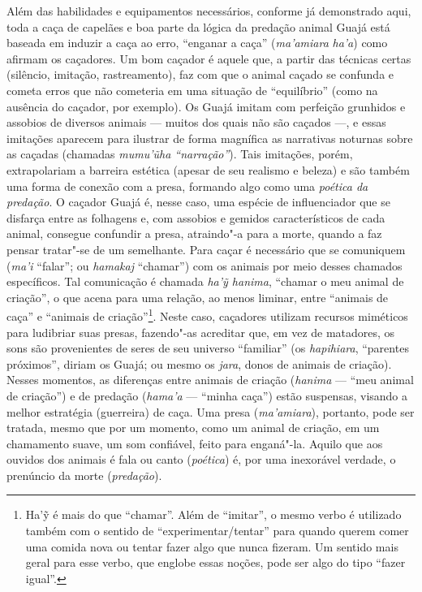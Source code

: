 Além das habilidades e equipamentos necessários, conforme já demonstrado
aqui, toda a caça de capelães e boa parte da lógica da predação animal
Guajá está baseada em induzir a caça ao erro, ``enganar a caça''
(\emph{ma'amiara} \emph{ha'a}) como afirmam os caçadores. Um bom caçador
é aquele que, a partir das técnicas certas (silêncio, imitação,
rastreamento), faz com que o animal caçado se confunda e cometa erros
que não cometeria em uma situação de ``equilíbrio'' (como na ausência do
caçador, por exemplo). Os Guajá imitam com perfeição grunhidos e
assobios de diversos animais --- muitos dos quais não são caçados ---, e
essas imitações aparecem para ilustrar de forma magnífica as narrativas
noturnas sobre as caçadas (chamadas \emph{mumu'ũha ``narração''}). Tais
imitações, porém, extrapolariam a barreira estética (apesar de seu
realismo e beleza) e são também uma forma de conexão com a presa,
formando algo como uma \emph{poética da predação}. O caçador Guajá é,
nesse caso, uma espécie de influenciador que se disfarça entre as
folhagens e, com assobios e gemidos característicos de cada animal,
consegue confundir a presa, atraindo"-a para a morte, quando a faz pensar
tratar"-se de um semelhante. Para caçar é necessário que se comuniquem
(\emph{ma'i} ``falar''; ou \emph{hamakaj} ``chamar'') com os animais por
meio desses chamados específicos. Tal comunicação é chamada \emph{ha'ỹ
hanima}, ``chamar o meu animal de criação'', o que acena para uma relação,
ao menos liminar, entre ``animais de caça'' e ``animais de
criação''\footnote{Ha'ỹ é mais do que ``chamar''. Além de ``imitar'', o
  mesmo verbo é utilizado também com o sentido de
  ``experimentar/tentar'' para quando querem comer uma comida nova ou
  tentar fazer algo que nunca fizeram. Um sentido mais geral para esse
  verbo, que englobe essas noções, pode ser algo do tipo ``fazer
  igual''.}. Neste caso, caçadores utilizam recursos miméticos para
ludibriar suas presas, fazendo"-as acreditar que, em vez de matadores, os
sons são provenientes de seres de seu universo ``familiar'' (os
\emph{hapihiara}, ``parentes próximos'', diriam os Guajá; ou mesmo os
\emph{jara}, donos de animais de criação). Nesses momentos, as
diferenças entre animais de criação (\emph{hanima} --- ``meu animal de
criação'') e de predação (\emph{hama'a} --- ``minha caça'') estão suspensas,
visando a melhor estratégia (guerreira) de caça. Uma presa
(\emph{ma'amiara}), portanto, pode ser tratada, mesmo que por um
momento, como um animal de criação, em um chamamento suave, um som
confiável, feito para enganá"-la. Aquilo que aos ouvidos dos animais é
fala ou canto (\emph{poética}) é, por uma inexorável verdade, o
prenúncio da morte (\emph{predação}).

